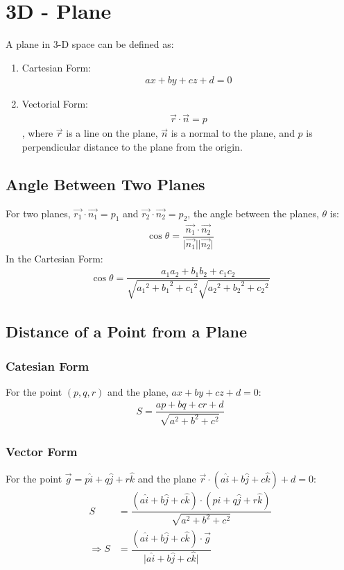\documentclass[../main.tex]{subfile}
\begin{document}
\chapter{3D - Plane}
    A plane in 3-D space can be defined as:
    \begin{enumerate}
    \item Cartesian Form: \begin{align} ax+by+cz+d=0 \end{align}
    \item Vectorial Form: \begin{align}\vec{r}\cdot\vec{n}=p\end{align}, where $\vec{r}$ is a line on the plane, $\vec{n}$ is a normal to the plane, and $p$ is perpendicular distance to the plane from the origin.
    \end{enumerate}

    \section{Angle Between Two Planes}
    For two planes, $\vec{r_1}\cdot\vec{n_1}=p_1$ and $\vec{r_2}\cdot\vec{n_2}=p_2$, the angle between the planes, $\theta$ is:
    \begin{align}
    \cos \theta=\dfrac{\vec{n_1}\cdot\vec{n_2}}{\lvert \vec{n_1} \rvert \lvert \vec{n_2} \rvert}
    \end{align}
    In the Cartesian Form:
    \begin{align}
    \cos \theta = \dfrac{a_1a_2+b_1b_2+c_1c_2}{\sqrt{{a_1}^2+{b_1}^2+{c_1}^2}\sqrt{{a_2}^2+{b_2}^2+{c_2}^2}}
    \end{align}

    \section{Distance of a Point from a Plane}
    \subsection{Catesian Form}
    For the point $(p,q,r)$ and the plane, $ax+by+cz+d=0$:
    \begin{align}
    S=\dfrac{ap+bq+cr+d}{\sqrt{a^2+b^2+c^2}}
    \end{align}
    \subsection{Vector Form}
    For the point $\vec{g}=p\hat{i}+q\hat{j}+r\hat{k}$ and the plane $\vec{r}\cdot(a\hat{i}+b\hat{j}+c\hat{k})+d=0$:
    \begin{align}
    S & = \dfrac{ \left(a \hat{i} + b \hat{j} + c \hat{k} \right) \cdot \left( p \hat{i} + q \hat{j} + r\hat{k} \right) }{ \sqrt{ a^2 + b^2 + c^2}} \\
    \Rightarrow S & = \dfrac{ \left( a \hat{i} + b \hat{j} + c \hat{k} \right) \cdot \vec{g} }{ \vert a \hat{i} + b \hat{j} + c \hat{k} \vert}
    \end{align}
\end{document}
